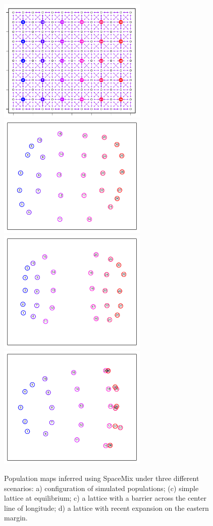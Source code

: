 \documentclass[12pt]{article}
\begin{document}
\begin{figure}
	\centering
			{\includegraphics[width=2.8in,height=2.33in]{figs/sims/basic_lattice.png}}
			{\includegraphics[width=2.8in,height=2.33in]{figs/sims/GeoGenMap_lattice.pdf}}
			{\includegraphics[width=2.8in,height=2.33in]{figs/sims/GeoGenMap_barrier.pdf}}
			{\includegraphics[width=2.8in,height=2.33in]{figs/sims/GeoGenMap_expansion.pdf}}
	\caption{Population maps inferred using SpaceMix under three different scenarios: a) configuration of simulated populations; (c) simple lattice at equilibrium; c) a lattice with a barrier across the center line of longitude; d) a lattice with recent expansion on the eastern margin.}\label{sfig:lattice_scenarios}
\end{figure}
\end{document}
